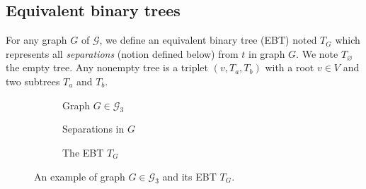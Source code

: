 \documentclass[preprint]{elsarticle}
\newcommand{\set}[1]{\left\{ #1 \right\}}
\newcommand{\card}[1]{\left| #1 \right|}
\newcommand{\mcalg}{\mathcal{G}}
\newcommand{\mts}{MS}
\newcommand{\ebt}{EBT}
\begin{document}
%

\subsection{Equivalent binary trees} \label{subsec:ebt}

For any graph $G$ of $\mcalg$, we define an equivalent binary tree (\ebt ) noted $T_G$ which represents all \textit{separations} (notion defined below) from $t$ in graph $G$. We note $T_\varnothing$ the empty tree. Any nonempty tree is a triplet $(v, T_a, T_b)$ with a root $v \in V$ and two subtrees $T_a$ and $T_b$.

\begin{figure}[h]
\centering
\begin{subfigure}[b]{0.3\columnwidth}
\centering
\scalebox{.42}{}
\caption{Graph $G \in \mcalg_3$}
\label{subfig:ebt_1}
\end{subfigure}
\begin{subfigure}[b]{0.33\columnwidth}
\centering
\scalebox{.42}{}
\caption{Separations in $G$}
\label{subfig:ebt_2}
\end{subfigure}
\begin{subfigure}[b]{0.3\columnwidth}
\centering
\scalebox{.58}{}
\caption{The EBT $T_G$}
\label{subfig:ebt_3}
\end{subfigure}
\caption{An example of graph $G \in \mcalg_3$ and its EBT $T_G$.}
\label{fig:ebt}
\end{figure}
\end{document}
